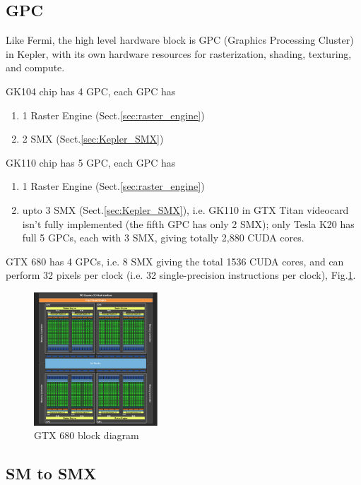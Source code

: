 \subsection{GPC}
\label{sec:Kepler_GPC}

Like Fermi, the high level hardware block is GPC (Graphics Processing Cluster)
in Kepler, with its own hardware resources for rasterization, shading,
texturing, and compute. 

GK104 chip has 4 GPC, each GPC has
\begin{enumerate}
  \item 1 Raster Engine (Sect.\ref{sec:raster_engine})
  \item 2 SMX (Sect.\ref{sec:Kepler_SMX})
\end{enumerate}

GK110 chip has 5 GPC, each GPC has
\begin{enumerate}
  \item 1 Raster Engine (Sect.\ref{sec:raster_engine})
  \item upto 3 SMX (Sect.\ref{sec:Kepler_SMX}), i.e.  GK110 in GTX Titan
  videocard isn't fully implemented (the fifth GPC has only 2 SMX); only Tesla
  K20 has full 5 GPCs, each with 3 SMX, giving totally 2,880 CUDA cores. 

\end{enumerate}

GTX 680 has 4 GPCs, i.e. 8 SMX giving the total 1536 CUDA cores, and can perform
32 pixels per clock (i.e. 32 single-precision instructions per clock),
Fig.\ref{fig:GTX680_GK104}.

\begin{figure}[htb]
  \centerline{\includegraphics[height=5cm]{./images/GK104_GTX680.eps}}
  \caption{GTX 680 block diagram}
  \label{fig:GTX680_GK104}
\end{figure}


\subsection{SM to SMX}
\label{sec:SMX}

